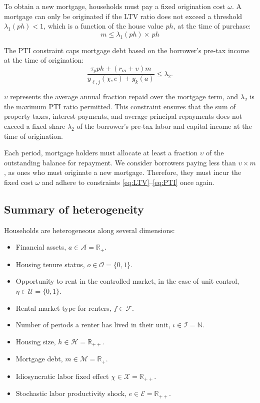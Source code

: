 \documentclass[parskip=full]{article}
\begin{document}
To obtain a new mortgage, households must pay a fixed origination cost $\omega$. A mortgage can only be originated if the LTV ratio does not exceed a threshold $\lambda_{1}(ph)<1$, which is a function of the house value $ph$, at the time of purchase:
\begin{equation}\label{eq:LTV}
m \leq \lambda_{1}(ph) \times \,p h
\end{equation}

\noindent The PTI constraint caps mortgage debt based on the borrower's pre-tax income at the time of origination: 
\begin{equation}\label{eq:PTI}
\frac{\tau_{p}ph+(r_{m}+\upsilon)m}{y_{\ell,j}(\chi,e)+y_{k}(a)} \leq \lambda_{2}.
\end{equation}

\noindent $\upsilon$ represents the average annual fraction repaid over the mortgage term, and $\lambda_{2}$ is the maximum PTI ratio permitted. This constraint ensures that the sum of property taxes, interest payments, and average principal repayments does not exceed a fixed share $\lambda_{2}$ of the borrower's pre-tax labor and capital income at the time of origination.

Each period, mortgage holders must allocate at least a fraction $\upsilon$ of the outstanding balance for repayment. We consider borrowers paying less than $\upsilon \times m$, as ones who must originate a new mortgage. Therefore, they must incur the fixed cost $\omega$ and adhere to constraints \eqref{eq:LTV}--\eqref{eq:PTI} once again.

\subsection{Summary of heterogeneity}

Households are heterogeneous along several dimensions:

\begin{itemize}
    \item Financial assets, $a\in \mathcal{A}=\mathbb{R}_{+}$.
    \item Housing tenure status, $o \in \mathcal{O}=\{0,1\}$.
    \item Opportunity to rent in the controlled market, in the case of unit control, $\eta \in \mathcal{U}=\{0,1\}$.
    \item Rental market type for renters, $f \in \mathcal{F}$.
    \item Number of periods a renter has lived in their unit, $\iota \in \mathcal{I}=\mathbb{N}$.
    \item Housing size, $h\in \mathcal{H}=\mathbb{R}_{++}$.
    \item Mortgage debt, $m \in \mathcal{M}=\mathbb{R}_{+}$.
    \item Idiosyncratic labor fixed effect $\chi \in \mathcal{X}=\mathbb{R}_{++}$.
    \item Stochastic labor productivity shock, $e \in \mathcal{E} = \mathbb{R}_{++}$.
\end{itemize}
 
\end{document}
